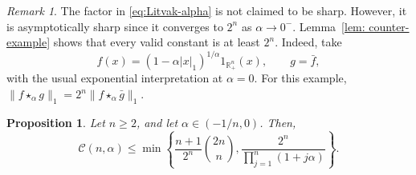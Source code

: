 \documentclass[11pt]{amsart}
\theoremstyle{plain}
\newtheorem{prop}[theorem]{Proposition}
\theoremstyle{definition}
\theoremstyle{remark}
\newtheorem{remark}{Remark}
\begin{document}
\begin{remark} \label{remark7}
The factor in \eqref{eq:Litvak-alpha} is not claimed to be sharp. However, it is asymptotically sharp since it converges to $2^n$ as $ \alpha \to 0^-$.
Lemma~\ref{lem: counter-example} shows that every valid constant is at
least \(2^n\).  Indeed, take
\[
 f(x)=(1-\alpha|x|_1)^{1/\alpha}1_{\mathbb R_+^n}(x),
 \qquad g=\bar f,
\]
with the usual exponential interpretation at \(\alpha=0\).  For this
example,
\(\|f\star_\alpha g\|_1=2^n\|f\star_\alpha\bar g\|_1\).
\end{remark}


\begin{prop} \label{eq:improved-diff-alpha}
    Let  $n\geq 2$, and let $\alpha \in (-1/n,0)$. Then,
    \[
        \mathcal{C}(n,\alpha) \leq \min \left\{\frac{n+1}{2^n}\binom{2 n}{n}, \frac{2^n}{\prod_{j=1}^n(1+j \alpha)} \right\}.
    \]
\end{prop}
\end{document}
